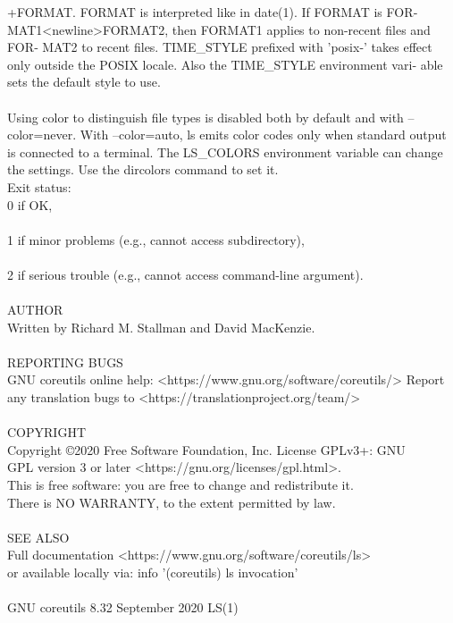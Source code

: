 \documentclass{article}
\begin{document}
\tabto{1cm}       +FORMAT.   FORMAT  is  interpreted  like in date(1).  If FORMAT is FOR‐
\tabto{1cm}       MAT1<newline>FORMAT2, then FORMAT1 applies to non-recent files and FOR‐
\tabto{1cm}       MAT2  to  recent files.  TIME_STYLE prefixed with 'posix-' takes effect
\tabto{1cm}       only outside the POSIX locale.  Also the TIME_STYLE  environment  vari‐
\tabto{1cm}       able sets the default style to use. \\
\\
\tabto{1cm}       Using  color  to distinguish file types is disabled both by default and
\tabto{1cm}       with --color=never.  With --color=auto, ls emits color codes only  when
\tabto{1cm}       standard  output is connected to a terminal.  The LS_COLORS environment
\tabto{1cm}       variable can change the settings.  Use the dircolors command to set it.
\\
   Exit status: \\
\tabto{1cm}       0      if OK, \\
\\
\tabto{1cm}       1      if minor problems (e.g., cannot access subdirectory), \\
\\
\tabto{1cm}       2      if serious trouble (e.g., cannot access command-line argument). \\
\\
AUTHOR \\
\tabto{1cm}       Written by Richard M. Stallman and David MacKenzie. \\
\\
REPORTING BUGS \\
\tabto{1cm}       GNU coreutils online help: <https://www.gnu.org/software/coreutils/>
\tabto{1cm}       Report any translation bugs to <https://translationproject.org/team/> \\
\\
COPYRIGHT \\
\tabto{1cm}       Copyright \copyright 2020 Free Software Foundation, Inc.   License  GPLv3+:  GNU \\
\tabto{1cm}       GPL version 3 or later <https://gnu.org/licenses/gpl.html>. \\
\tabto{1cm}       This  is  free  software:  you  are free to change and redistribute it. \\
\tabto{1cm}       There is NO WARRANTY, to the extent permitted by law. \\
\\
SEE ALSO \\
\tabto{1cm}       Full documentation <https://www.gnu.org/software/coreutils/ls> \\
\tabto{1cm}       or available locally via: info '(coreutils) ls invocation' \\
\\
GNU coreutils 8.32              September 2020                           LS(1) \\
\end{document}
